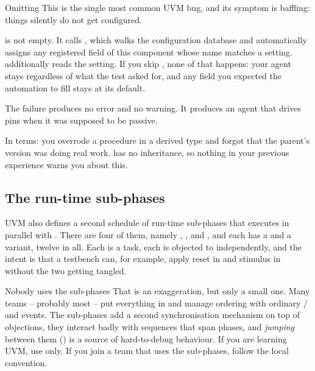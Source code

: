 \begin{gotcha}{Omitting }
%
This is the single most common UVM bug, and its symptom is baffling: things
silently do not get configured.

 is not empty. It calls
, which walks the configuration database and
automatically assigns any registered field of this component whose name
matches a setting.  additionally reads the
 setting. If you skip ,
none of that happens: your agent stays  regardless of what
the test asked for, and any field you expected the automation to fill stays
at its default.

The failure produces no error and no warning. It produces an agent that
drives pins when it was supposed to be passive.

In \VHDL{} terms: you overrode a procedure in a derived type and forgot that
the parent's version was doing real work. \VHDL{} has no inheritance, so
nothing in your previous experience warns you about this.
\end{gotcha}

\subsection{The run-time sub-phases}
\label{sec:uvm:subphases}

%
UVM also defines a second schedule of run-time sub-phases that executes in
parallel with . There are four of them, namely
, ,  and , and
each has a  and a  variant, twelve in all. Each is
a task, each is objected to independently, and the intent is that a testbench can, for example, apply
reset in  and stimulus in  without the
two getting tangled.

\begin{notebox}{Nobody uses the sub-phases}
That is an exaggeration, but only a small one. Many teams -- probably most --
put everything in  and manage ordering with ordinary
/ and events. The sub-phases add a second synchronisation
mechanism on top of objections, they interact badly with sequences that span
phases, and \emph{jumping} between them () is a source of
hard-to-debug behaviour. If you are learning UVM, use  only.
If you join a team that uses the sub-phases, follow the local convention.
\end{notebox}

